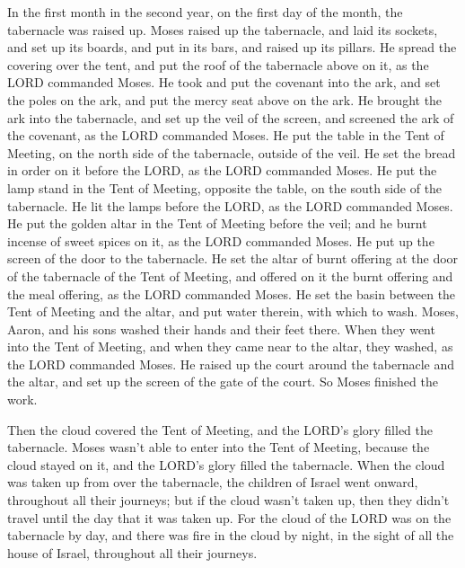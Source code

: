  In the first month in the second year, on the first day
of the month, the tabernacle was raised up.  Moses raised
up the tabernacle, and laid its sockets, and set up its boards, and put
in its bars, and raised up its pillars.  He spread the
covering over the tent, and put the roof of the tabernacle above on it,
as the LORD commanded Moses.  He took and put the
covenant into the ark, and set the poles on the ark, and put the mercy
seat above on the ark.  He brought the ark into the
tabernacle, and set up the veil of the screen, and screened the ark of
the covenant, as the LORD commanded Moses.  He put the
table in the Tent of Meeting, on the north side of the tabernacle,
outside of the veil.  He set the bread in order on it
before the LORD, as the LORD commanded Moses.  He put the
lamp stand in the Tent of Meeting, opposite the table, on the south side
of the tabernacle.  He lit the lamps before the LORD, as
the LORD commanded Moses.  He put the golden altar in the
Tent of Meeting before the veil;  and he burnt incense of
sweet spices on it, as the LORD commanded Moses.  He put
up the screen of the door to the tabernacle.  He set the
altar of burnt offering at the door of the tabernacle of the Tent of
Meeting, and offered on it the burnt offering and the meal offering, as
the LORD commanded Moses.  He set the basin between the
Tent of Meeting and the altar, and put water therein, with which to
wash.  Moses, Aaron, and his sons washed their hands and
their feet there.  When they went into the Tent of
Meeting, and when they came near to the altar, they washed, as the LORD
commanded Moses.  He raised up the court around the
tabernacle and the altar, and set up the screen of the gate of the
court. So Moses finished the work.

 Then the cloud covered the Tent of Meeting, and the
LORD's glory filled the tabernacle.  Moses wasn't able to
enter into the Tent of Meeting, because the cloud stayed on it, and the
LORD's glory filled the tabernacle.  When the cloud was
taken up from over the tabernacle, the children of Israel went onward,
throughout all their journeys;  but if the cloud wasn't
taken up, then they didn't travel until the day that it was taken up.
 For the cloud of the LORD was on the tabernacle by day,
and there was fire in the cloud by night, in the sight of all the house
of Israel, throughout all their journeys.
